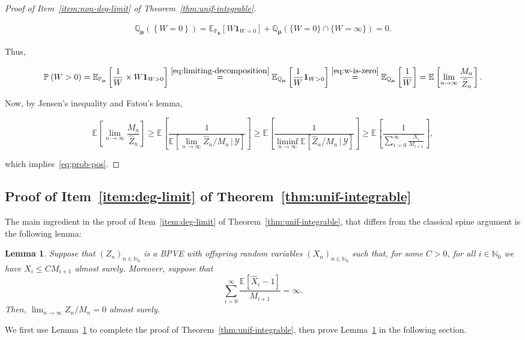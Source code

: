\documentclass[12pt]{article}
\newtheorem{lem}[thm]{Lemma}
\theoremstyle{definition}
\newcommand{\E}[2][]{\ensuremath{\mathbb{E}_{#1}\left[#2 \right]}}
\newcommand{\Prob}[2][]{\ensuremath{\mathbb{P}_{#1} \left(#2 \right)}}
\newcommand{\Probtwo}[2][]{\ensuremath{\mathbb{Q}_{#1} \left(#2 \right)}}
\begin{document}
\begin{proof}[Proof of Item~\ref{item:non-deg-limit} of Theorem~\ref{thm:unif-integrable}]
\begin{linenomath}
    \begin{align} \label{eq:w-is-zero}
        \Probtwo[\boldsymbol{\mu}]{\left\{W = 0\right\}} = \E[\mathbb{P}_{\boldsymbol{\mu}}]{W\mathbf{1}_{W = 0}} + \Probtwo[\boldsymbol{\mu}]{\{W = 0\} \cap \{W = \infty\}} = 0.   
    \end{align}
\end{linenomath}
Thus,
\begin{linenomath}
    \begin{align}
\Prob{W > 0} = \E[\mathbb{P}_{\boldsymbol{\mu}}]{\frac{1}{W} \times W \mathbf{1}_{W >0}} \stackrel{\eqref{eq:limiting-decomposition}}{=} \E[\mathbb{Q}_{\boldsymbol{\mu}}]{\frac{1}{W} \mathbf{1}_{W >0}} \stackrel{\eqref{eq:w-is-zero}}{=} \E[\mathbb{Q}_{\boldsymbol{\mu}}]{\frac{1}{W}}  = \E{\lim_{n \to \infty} \frac{M_{n}}{\widehat{Z}_{n}}}. 
    \end{align}
\end{linenomath}
Now, by Jensen's inequality and Fatou's lemma, 
\begin{linenomath}
 \[\E{\lim_{n \to \infty} \frac{M_{n}}{\widehat{Z}_{n}}} \geq \E{\frac{1}{\E{\lim_{n \to \infty} \widehat{Z}_{n}/M_{n} \, | \, \mathscr{Y}}}} \geq \E{\frac{1}{\liminf_{n \to \infty}\E{ \widehat{Z}_{n}/M_{n} \, | \, \mathscr{Y}}}} \geq \E{\frac{1}{\sum_{i=0}^{\infty} \frac{N_i}{M_{i+1}}}},\]
\end{linenomath}
which implies~\eqref{eq:prob-pos}. 
\end{proof}

\subsection{Proof of Item~\ref{item:deg-limit} of Theorem~\ref{thm:unif-integrable}}
The main ingredient in the proof of Item~\ref{item:deg-limit} of Theorem~\ref{thm:unif-integrable}, that differs from the classical spine argument is the following lemma:
\begin{lem} \label{lem:trunc}
Suppose that $(Z_{n})_{n \in \mathbb{N}_0}$ is a BPVE with offspring random variables $(X_{n})_{n \in \mathbb{N}_0}$ such that, for some $C >0$, for all $i \in \mathbb{N}_0$ we have $\widehat{X}_{i} \leq C M_{i+1}$ almost surely. Moreover, suppose that 
\[
\sum_{i=0}^{\infty} \frac{\E{\widehat{X}_{i} - 1}}{M_{i+1}} = \infty. 
\]
Then, $\lim_{n \to \infty} Z_n/M_n = 0$ almost surely. 
\end{lem}

We first use Lemma~\ref{lem:trunc} to complete the proof of Theorem~\ref{thm:unif-integrable}, then prove Lemma~\ref{lem:trunc} in the following section. 
\end{document}
